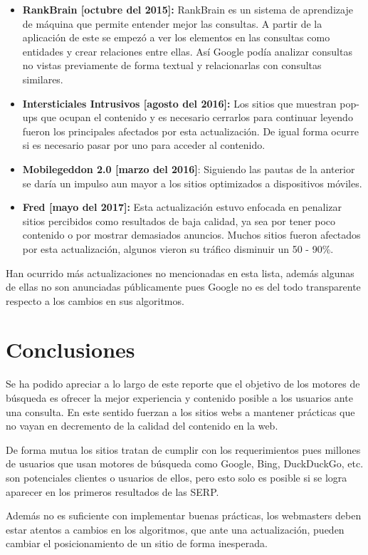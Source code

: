\documentclass[12pt]{llncs}
\begin{document}
\begin{itemize}
\item \textbf{RankBrain [octubre del 2015]:} RankBrain es un sistema de aprendizaje de máquina que permite entender mejor las consultas. A partir de la aplicación de este se empezó a ver los elementos en las consultas como entidades y crear relaciones entre ellas. Así Google podía analizar consultas no vistas previamente de forma textual y relacionarlas con consultas similares.

\item \textbf{Intersticiales Intrusivos [agosto del 2016]:} Los sitios que muestran pop-ups que ocupan el contenido y es necesario cerrarlos para continuar leyendo fueron los principales afectados por esta actualización. De igual forma ocurre si es necesario pasar por uno para acceder al contenido.

\item \textbf{Mobilegeddon 2.0 [marzo del 2016]}: Siguiendo las pautas de la anterior se daría un impulso aun mayor a los sitios optimizados a dispositivos móviles. \cite{mobilgeddon2}

\item \textbf{Fred [mayo del 2017]:} Esta actualización estuvo enfocada en penalizar sitios percibidos como resultados de baja calidad, ya sea por tener poco contenido o por mostrar demasiados anuncios. Muchos sitios fueron afectados por esta actualización, algunos vieron su tráfico disminuir un 50 - 90\%. \cite{fred}

\end{itemize}

Han ocurrido más actualizaciones no mencionadas en esta lista, además algunas de ellas no son anunciadas públicamente pues Google no es del todo transparente respecto a los cambios en sus algoritmos.

\section{Conclusiones}

Se ha podido apreciar a lo largo de este reporte que el objetivo de los motores de búsqueda es ofrecer la mejor experiencia y contenido posible a los usuarios ante una consulta. En este sentido fuerzan a los sitios webs a mantener prácticas que no vayan en decremento de la calidad del contenido en la web.

De forma mutua los sitios tratan de cumplir con los requerimientos pues millones de usuarios que usan motores de búsqueda como Google, Bing, DuckDuckGo, etc. son potenciales clientes o usuarios de ellos, pero esto solo es posible si se logra aparecer en los primeros resultados de las SERP.

Además no es suficiente con implementar buenas prácticas, los webmasters deben estar atentos a cambios en los algoritmos, que ante una actualización, pueden cambiar el posicionamiento de un sitio de forma inesperada.

 

\end{document}
